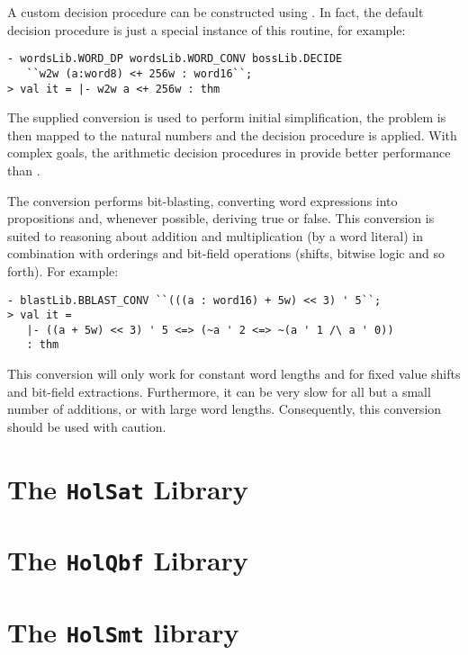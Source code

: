 A custom decision procedure can be constructed using .  In fact, the default decision procedure is just a special instance of this routine, for example:
\begin{session}
\begin{verbatim}
- wordsLib.WORD_DP wordsLib.WORD_CONV bossLib.DECIDE
   ``w2w (a:word8) <+ 256w : word16``;
> val it = |- w2w a <+ 256w : thm
\end{verbatim}
\end{session}
The supplied conversion is used to perform initial simplification, the problem is then mapped to the natural numbers and the decision procedure is applied.  With complex goals, the arithmetic decision procedures in  provide better performance than .

The conversion  performs bit-blasting, converting word expressions into propositions and, whenever possible, deriving true or false. This conversion is suited to reasoning about addition and multiplication (by a word literal) in combination with orderings and bit-field operations (shifts, bitwise logic and so forth).  For example:
\begin{session}
\begin{verbatim}
- blastLib.BBLAST_CONV ``(((a : word16) + 5w) << 3) ' 5``;
> val it =
   |- ((a + 5w) << 3) ' 5 <=> (~a ' 2 <=> ~(a ' 1 /\ a ' 0))
   : thm
\end{verbatim}
\end{session}
This conversion will only work for constant word lengths and for fixed value shifts and bit-field extractions.  Furthermore, it can be very slow for all but a small number of additions, or with large word lengths. Consequently, this conversion should be used with caution.

\section{The \texttt{HolSat} Library}\label{sec:HolSatLib}



\section{The \texttt{HolQbf} Library}\label{sec:HolQbfLib}



\section{The \texttt{HolSmt} library}\label{sec:HolSmtLib}



